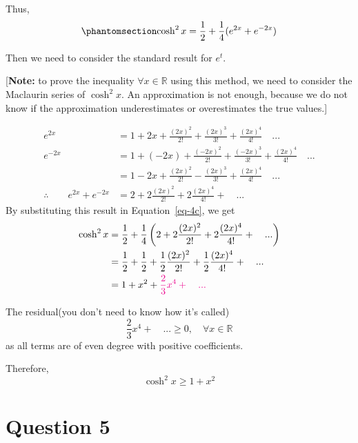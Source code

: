 \documentclass[
  a4paper,
]{report}
\begin{document}
\begin{tcolorbox}
Thus,
\begin{equation}\phantomsection\label{eq-4c}{\cosh^2x=\frac{1}{2}+\frac{1}{4}(e^{2x}+e^{-2x})}\end{equation}

Then we need to consider the standard result for \(e^t\).

{[}\textbf{Note:} to prove the inequality \(\forall x \in \mathbb{R}\)
using this method, we need to consider the Maclaurin series of
\(\cosh^2 x\). An approximation is not enough, because we do not know if
the approximation underestimates or overestimates the true values.{]}

\begin{equation*}
\begin{split}
e^{2x}&=1+2x+\frac{(2x)^2}{2!}+\frac{(2x)^3}{3!}+\frac{(2x)^4}{4!} \quad ... \\
e^{-2x}&=1+(-2x)+\frac{(-2x)^2}{2!}+\frac{(-2x)^3}{3!}+\frac{(2x)^4}{4!} \quad ... \\
&=1-2x+\frac{(2x)^2}{2!}-\frac{(2x)^3}{3!}+\frac{(2x)^4}{4!} \quad ... \\
\therefore \qquad e^{2x}+e^{-2x}&=2+2\frac{(2x)^2}{2!}+2\frac{(2x)^4}{4!}+ \quad ...
\end{split}
\end{equation*} By substituting this result in Equation~\ref{eq-4c}, we
get \begin{equation*}
\begin{split}
\cosh ^2 x &=\frac{1}{2}+\frac{1}{4} \left(2+2\frac{(2x)^2}{2!}+2\frac{(2x)^4}{4!}+ \quad ... \right)\\
&=\frac{1}{2}+\frac{1}{2}+\frac{1}{2}\frac{(2x)^2}{2!}+\frac{1}{2}\frac{(2x)^4}{4!}+ \quad ... \\
&=1+x^2+\textcolor{magenta}{\frac{2}{3}x^4+ \quad ...}
\end{split}
\end{equation*}

The residual(you don't need to know how it's called)
\[\frac{2}{3}x^4+ \quad ... \geq 0, \quad \forall x \in \mathbb{R}\] as
all terms are of even degree with positive coefficients.

Therefore, \[\cosh ^2 x \geq 1+x^2\]

\end{tcolorbox}

\section{Question 5}\label{question-5}
\end{document}
